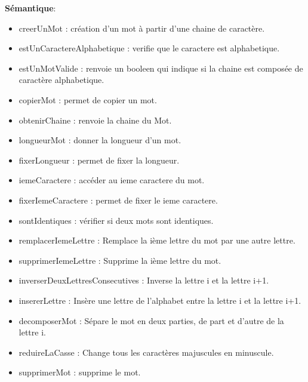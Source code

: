 \documentclass{article}
\begin{document}
    \textbf{Sémantique}: \begin{itemize}[label=$\- $, leftmargin=2cm, itemsep=0cm]
      	\item creerUnMot : création d’un mot à partir d’une chaine de caractère.
      	\item estUnCaractereAlphabetique : verifie que le caractere est alphabetique.
      	\item estUnMotValide : renvoie un booleen qui indique si la chaine est composée de caractère alphabetique.
      	\item copierMot : permet de copier un mot.
      	\item obtenirChaine : renvoie la chaine du Mot.
        \item longueurMot : donner la longueur d’un mot.
        \item fixerLongueur : permet de fixer la longueur.
        \item iemeCaractere : accéder au ieme caractere du mot.
        \item fixerIemeCaractere : permet de fixer le ieme caractere.
        \item sontIdentiques : vérifier si deux mots sont identiques.
        \item remplacerIemeLettre : Remplace la ième lettre du mot par une autre lettre.
        \item supprimerIemeLettre : Supprime la ième lettre du mot.
        \item inverserDeuxLettresConsecutives : Inverse la lettre i et la lettre i+1.
        \item insererLettre : Insère une lettre de l'alphabet entre la lettre i et la lettre i+1.
        \item decomposerMot : Sépare le mot en deux parties, de part et d'autre de la lettre i.
        \item reduireLaCasse : Change tous les caractères majuscules en minuscule.
        \item supprimerMot : supprime le mot.
    \end{itemize}
\end{document}

